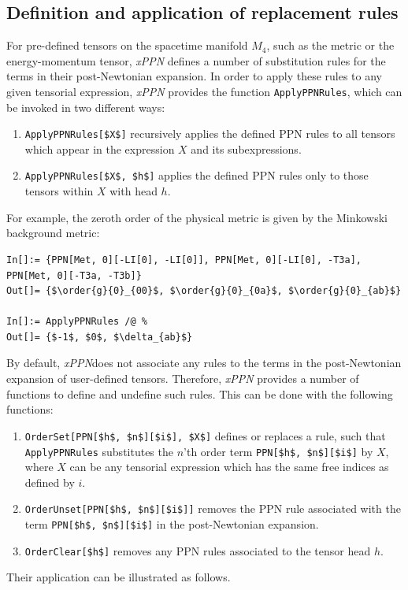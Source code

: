 \documentclass[notitlepage,a4paper,aps,prd,onecolumn,superscriptaddress,nofootinbib,groupedaddress,longbibliography]{revtex4-1}
\newcommand{\order}[2]{\accentset{#2}{#1}}
\newcommand{\xPPN}{\emph{xPPN}}
\begin{document}
\subsection{Definition and application of replacement rules}\label{ssec:orderrules}
For pre-defined tensors on the spacetime manifold \(M_4\), such as the metric or the energy-momentum tensor, \xPPN{} defines a number of substitution rules for the terms in their post-Newtonian expansion. In order to apply these rules to any given tensorial expression, \xPPN{} provides the function \lstinline/ApplyPPNRules/, which can be invoked in two different ways:
\begin{enumerate}
\item
\lstinline/ApplyPPNRules[$X$]/ recursively applies the defined PPN rules to all tensors which appear in the expression \(X\) and its subexpressions.
\item
\lstinline/ApplyPPNRules[$X$, $h$]/ applies the defined PPN rules only to those tensors within \(X\) with head \(h\).
\end{enumerate}
For example, the zeroth order of the physical metric is given by the Minkowski background metric:
\begin{lstlisting}
In[]:= {PPN[Met, 0][-LI[0], -LI[0]], PPN[Met, 0][-LI[0], -T3a], PPN[Met, 0][-T3a, -T3b]}
Out[]= {$\order{g}{0}_{00}$, $\order{g}{0}_{0a}$, $\order{g}{0}_{ab}$}

In[]:= ApplyPPNRules /@ %
Out[]= {$-1$, $0$, $\delta_{ab}$}
\end{lstlisting}
By default, \xPPN does not associate any rules to the terms in the post-Newtonian expansion of user-defined tensors. Therefore, \xPPN{} provides a number of functions to define and undefine such rules. This can be done with the following functions:
\begin{enumerate}
\item
\lstinline/OrderSet[PPN[$h$, $n$][$i$], $X$]/ defines or replaces a rule, such that \lstinline/ApplyPPNRules/ substitutes the $n$'th order term \lstinline/PPN[$h$, $n$][$i$]/ by $X$, where $X$ can be any tensorial expression which has the same free indices as defined by \(i\).
\item
\lstinline/OrderUnset[PPN[$h$, $n$][$i$]]/ removes the PPN rule associated with the term \lstinline/PPN[$h$, $n$][$i$]/ in the post-Newtonian expansion.
\item
\lstinline/OrderClear[$h$]/ removes any PPN rules associated to the tensor head \(h\).
\end{enumerate}
Their application can be illustrated as follows.
\end{document}
